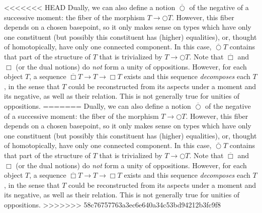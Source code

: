 \documentclass{article}
\begin{document}
<<<<<<< HEAD
Dually, we can also define a notion $\overline{\bigcirc}$ of the negative of a successive moment: the fiber 
of the morphism $T\rightarrow \bigcirc T$. However, this fiber depends on a chosen basepoint, so it only 
makes sense on types which have only one constituent (but possibly this constituent has (higher) equalities),
or, thought of homotopically, have only one connected component. In this case, $\overline{\bigcirc} T$ 
contains that part of the structure of $T$ that is trivialized by $T\rightarrow\bigcirc T$. Note that 
$\overline{\Box}$ and $\Box$ (or the dual notions) do \emph{not} form a unity of oppositions. However, for 
each object $T$, a sequence $\overline{\Box} T \rightarrow T \rightarrow \Box T$ exists and this sequence 
\emph{decomposes} each $T$, in the sense that $T$ could be reconstructed from its aspects under a moment and 
its negative, as well as their relation. This is not generally true for unities of oppositions.
=======
Dually, we can also define a notion $\overline{\bigcirc}$ of the negative of a successive moment: the
fiber of the morphism $T\rightarrow \bigcirc T$. However, this fiber depends on a chosen basepoint, so
it only makes sense on types which have only one constituent (but possibly this constituent has (higher)
equalities), or, thought of homotopically, have only one connected component. In this case, $\overline{\bigcirc}
T$ contains that part of the structure of $T$ that is trivialized by $T\rightarrow\bigcirc T$. Note that
$\overline{\Box}$ and $\Box$ (or the dual notions) do \emph{not} form a unity of oppositions. However,
for each object $T$, a sequence $\overline{\Box} T \rightarrow T \rightarrow \Box T$ exists and this sequence
\emph{decomposes} each $T$, in the sense that $T$ could be reconstructed from its aspects under a moment
and its negative, as well as their relation. This is not generally true for unities of oppositions.
>>>>>>> 58c76757763a3ec6e640a34c53bd94212b3fc9f8
\end{document}
